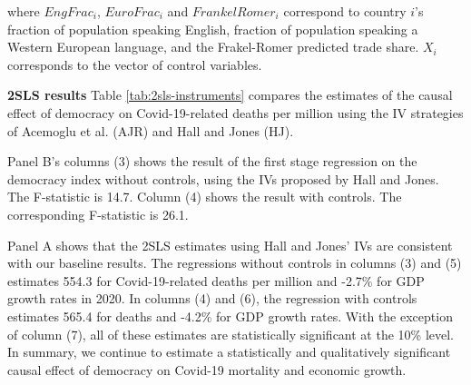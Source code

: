 \noindent where $EngFrac_i$, $EuroFrac_i$ and $FrankelRomer_i$ correspond to country $i$'s fraction of population speaking English, fraction of population speaking a Western European language, and the Frakel-Romer predicted trade share. $X_i$ corresponds to the vector of control variables. 

\noindent \textbf{2SLS results} Table \ref{tab:2sls-instruments} compares the estimates of the causal effect of democracy on Covid-19-related deaths per million using the IV strategies of Acemoglu et al. (AJR) and Hall and Jones (HJ). 

Panel B's columns (3) shows the result of the first stage regression on the democracy index without controls, using the IVs proposed by Hall and Jones. The F-statistic is 14.7. Column (4) shows the result with controls. The corresponding F-statistic is 26.1. 


Panel A shows that the 2SLS estimates using Hall and Jones' IVs are consistent with our baseline results. The regressions without controls in columns (3) and (5) estimates 554.3 for Covid-19-related deaths per million and -2.7\% for GDP growth rates in 2020. In columns (4) and (6), the regression with controls estimates 565.4 for deaths and -4.2\% for GDP growth rates. With the exception of column (7), all of these estimates are statistically significant at the 10\% level. In summary, we continue to estimate a statistically and qualitatively significant causal effect of democracy on Covid-19 mortality and economic growth. 

